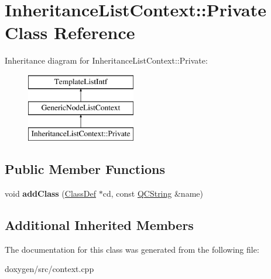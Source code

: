 \hypertarget{class_inheritance_list_context_1_1_private}{}\section{Inheritance\+List\+Context\+::Private Class Reference}
\label{class_inheritance_list_context_1_1_private}
Inheritance diagram for Inheritance\+List\+Context\+::Private\+:\begin{figure}[H]
\begin{center}
\leavevmode
\includegraphics[height=3.000000cm]{class_inheritance_list_context_1_1_private}
\end{center}
\end{figure}
\subsection*{Public Member Functions}
\begin{DoxyCompactItemize}
\item 
\mbox{\label{class_inheritance_list_context_1_1_private_af7aecd1ff668285aac59281586939f30}} 
void {\bfseries add\+Class} (\mbox{\hyperlink{class_class_def}{Class\+Def}} $\ast$cd, const \mbox{\hyperlink{class_q_c_string}{Q\+C\+String}} \&name)
\end{DoxyCompactItemize}
\subsection*{Additional Inherited Members}


The documentation for this class was generated from the following file\+:\begin{DoxyCompactItemize}
\item 
doxygen/src/context.\+cpp\end{DoxyCompactItemize}
